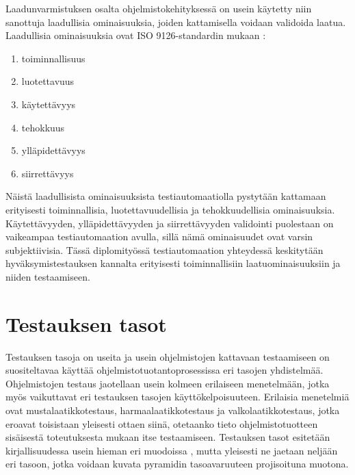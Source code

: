   Laadunvarmistuksen osalta ohjelmistokehityksessä on usein käytetty niin sanottuja laadullisia ominaisuuksia, joiden kattamisella voidaan validoida laatua.
  Laadullisia ominaisuuksia ovat ISO 9126-standardin mukaan \cite{iso_quality_attributes}:

  \begin{enumerate}
    \item toiminnallisuus
    \item luotettavuus
    \item käytettävyys
    \item tehokkuus
    \item ylläpidettävyys
    \item siirrettävyys
  \end{enumerate}

  Näistä laadullisista ominaisuuksista testiautomaatiolla pystytään kattamaan erityisesti toiminnallisia, luotettavuudellisia ja tehokkuudellisia ominaisuuksia.
  Käytettävyyden, ylläpidettävyyden ja siirrettävyyden validointi puolestaan on vaikeampaa testiautomaation avulla, sillä nämä ominaisuudet ovat varsin subjektiivisia.
  Tässä diplomityössä testiautomaation yhteydessä keskitytään hyväksymistestauksen kannalta erityisesti toiminnallisiin laatuominaisuuksiin ja niiden testaamiseen.

\section{Testauksen tasot} \label{ch:07_testauksen_tasot}

  Testauksen tasoja on useita ja usein ohjelmistojen kattavaan testaamiseen on suositeltavaa käyttää ohjelmistotuotantoprosessissa eri tasojen yhdistelmää.
  Ohjelmistojen testaus jaotellaan usein kolmeen erilaiseen menetelmään, jotka myös vaikuttavat eri testauksen tasojen käyttökelpoisuuteen.
  Erilaisia menetelmiä ovat mustalaatikkotestaus, harmaalaatikkotestaus ja valkolaatikkotestaus, jotka eroavat toisistaan yleisesti ottaen siinä, otetaanko tieto ohjelmistotuotteen sisäisestä toteutuksesta mukaan itse testaamiseen.
  Testauksen tasot esitetään kirjallisuudessa usein hieman eri muodoissa \cite[s.~277]{agile_testing_book} \cite[s.~16]{software_testing_and_qa_book}, mutta yleisesti ne jaetaan neljään eri tasoon, jotka voidaan kuvata pyramidin tasoavaruuteen projisoituna muotona.

